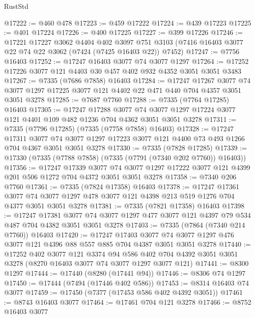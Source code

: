 \begin{lexlean}{RustStd}
\begin{coremodule}
@17222 := @460 @478
@17223 := @459 @17222
@17224 := @439 @17223
@17225 := @401 @17224
@17226 := @400 @17225
@17227 := @399 @17226
@17246 := @17221
    @17227
    @3062
    @4404
    @402
    @3097
    @751
    @3103
    (@7416 @16403 @3077 @22 @74 @22 @3062 (@7424 (@7425 @16403 @22)) @7452)
@17247 := @7756 @16403
@17252 := @17247 @16403 @3077 @74 @3077 @1297
@17264 := @17252 @17226 @3077 @121 @4403 @30 @457 @402 @932 @4352 @3051 @3051 @3483
@17267 := @7335 (@7686 @7858) @16403
@17284 := @17247
    @17267
    @3077
    @74
    @3077
    @1297
    @17225
    @3077
    @121
    @4402
    @22
    @471
    @440
    @704
    @4357
    @3051
    @3051
    @3278
@17285 := @7687 @7760
@17288 := @7335 (@7764 @17285) @16403
@17305 := @17247
    @17288
    @3077
    @74
    @3077
    @1297
    @17224
    @3077
    @121
    @4401
    @109
    @482
    @1236
    @704
    @4362
    @3051
    @3051
    @3278
@17311 := @7335 (@7796 @17285) (@7335 (@7758 @7858) @16403)
@17328 := @17247
    @17311
    @3077
    @74
    @3077
    @1297
    @17223
    @3077
    @121
    @4400
    @73
    @493
    @1266
    @704
    @4367
    @3051
    @3051
    @3278
@17330 := @7335 (@7828 @17285)
@17339 := @17330 (@7335 (@7788 @7858) (@7335 (@7791 (@7340 @202 @7760)) @16403))
@17356 := @17247
    @17339
    @3077
    @74
    @3077
    @1297
    @17222
    @3077
    @121
    @4399
    @201
    @506
    @1272
    @704
    @4372
    @3051
    @3051
    @3278
@17358 := @7340 @206 @7760
@17361 := @7335 (@7824 @17358) @16403
@17378 := @17247
    @17361
    @3077
    @74
    @3077
    @1297
    @478
    @3077
    @121
    @4398
    @213
    @519
    @1276
    @704
    @4377
    @3051
    @3051
    @3278
@17381 := @7335 (@7821 @17358) @16403
@17398 := @17247
    @17381
    @3077
    @74
    @3077
    @1297
    @477
    @3077
    @121
    @4397
    @79
    @534
    @487
    @704
    @4382
    @3051
    @3051
    @3278
@17403 := @7335 (@7864 (@7340 @214 @7760)) @16403
@17420 := @17247
    @17403
    @3077
    @74
    @3077
    @1297
    @476
    @3077
    @121
    @4396
    @88
    @557
    @885
    @704
    @4387
    @3051
    @3051
    @3278
@17440 := @17252
    @402
    @3077
    @121
    @3374
    @94
    @586
    @402
    @704
    @4392
    @3051
    @3051
    @3278
    (@8270 @16403 @3077 @74 @3077 @1297 @3077 @121)
@17441 := @8300 @1297
@17444 := @17440 (@8280 (@17441 @94))
@17446 := @8306 @74 @1297
@17450 := @17444 (@7494 (@17446 @402 @586))
@17453 := @8314 @16403 @74 @3077
@17459 := @17450 (@7377 (@17453 @586 @402 @4392 @3051))
@17461 := @8743 @16403 @3077
@17464 := @17461 @704 @121 @3278
@17466 := @8752 @16403 @3077

\end{coremodule}
\end{lexlean}
